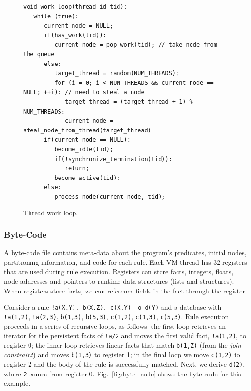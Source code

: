 \begin{figure}[h!]
   \vspace{-0.5\intextsep}
\scriptsize\begin{Verbatim}
void work_loop(thread_id tid):
   while (true):
      current_node = NULL;
      if(has_work(tid)):
         current_node = pop_work(tid); // take node from the queue
      else:
         target_thread = random(NUM_THREADS);
         for (i = 0; i < NUM_THREADS && current_node == NULL; ++i): // need to steal a node
            target_thread = (target_thread + 1) % NUM_THREADS;
            current_node = steal_node_from_thread(target_thread)
      if(current_node == NULL):
         become_idle(tid);
         if(!synchronize_termination(tid)):
            return;
         become_active(tid);
      else:
         process_node(current_node, tid);
\end{Verbatim}
\vspace{-0.5\intextsep}
  \caption{Thread work loop.}
  \label{code:work_loop}
  \vspace{-0.5\intextsep}
\end{figure}

\subsubsection{Byte-Code}

A byte-code file contains meta-data about the program's predicates, initial nodes, partitioning
information, and code for each rule.
Each VM thread has 32 registers that are used during rule execution.
Registers can store facts, integers, floats, node addresses and pointers to runtime 
data structures (lists and structures). When registers store facts, we can reference
fields in the fact through the register.

Consider a rule \texttt{!a(X,Y), b(X,Z), c(X,Y) -o d(Y)} and a database with
\texttt{!a(1,2)}, \texttt{!a(2,3)}, \texttt{b(1,3)}, \texttt{b(5,3)}, \texttt{c(1,2)}, \texttt{c(1,3)},
\texttt{c(5,3)}. Rule execution proceeds in a series of recursive loops, as follows: the first loop retrieves an
iterator for the persistent facts of \texttt{!a/2} and moves the first valid fact, \texttt{!a(1,2)},
to register 0; the inner loop retrieves linear facts that match \texttt{b(1,Z)} (from the
\emph{join constraint}) and moves \texttt{b(1,3)} to register 1; in the final
loop we move \texttt{c(1,2)} to register 2 and the body of the rule is successfully matched. Next, we
derive \texttt{d(2)}, where \texttt{2} comes from register 0.
Fig.~\ref{fig:byte_code} shows the byte-code for this example.

